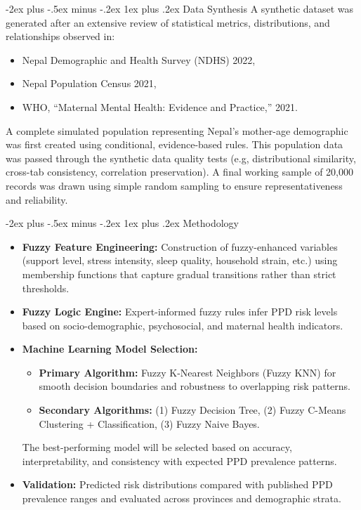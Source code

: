 \documentclass[conference]{IEEEtran}
\makeatletter
\def\section{\@startsection{section}{1}{0mm}
  {-2ex plus -.5ex minus -.2ex}
  {1ex plus .2ex}
  {\normalfont\large\bfseries}}
\makeatother
\begin{document}
\vspace{-6pt}
\section{Data Synthesis}
A synthetic dataset was generated after an extensive review of statistical metrics, distributions, and relationships observed in:
\begin{itemize}
    \item Nepal Demographic and Health Survey (NDHS) 2022,
    \item Nepal Population Census 2021,
    \item WHO, “Maternal Mental Health: Evidence and Practice,” 2021.
\end{itemize}

A complete simulated population representing Nepal’s mother-age 
demographic was first created using conditional, evidence-based rules. 
This population data was passed through the synthetic data quality tests 
(e.g, distributional similarity, cross-tab consistency, correlation 
preservation). A final working sample of 20,000 records was drawn 
using simple random sampling to ensure 
representativeness and reliability.

\vspace{-6pt}
\section{Methodology}
\begin{itemize}
    \item \textbf{Fuzzy Feature Engineering:} Construction of fuzzy-enhanced variables (support level, stress intensity, sleep quality, household strain, etc.) using membership functions that capture gradual transitions rather than strict thresholds.
    \item \textbf{Fuzzy Logic Engine:} Expert-informed fuzzy rules infer PPD risk levels based on socio-demographic, psychosocial, and maternal health indicators.
    \item \textbf{Machine Learning Model Selection:}
    \begin{itemize}
        \item \textbf{Primary Algorithm:} Fuzzy K-Nearest Neighbors (Fuzzy KNN) for smooth decision boundaries and robustness to overlapping risk patterns.
        \item \textbf{Secondary Algorithms:}  
              (1) Fuzzy Decision Tree,  
              (2) Fuzzy C-Means Clustering + Classification,  
              (3) Fuzzy Naive Bayes.
    \end{itemize}
    The best-performing model will be selected based on accuracy, interpretability, and consistency with expected PPD prevalence patterns.
    \item \textbf{Validation:} Predicted risk distributions compared with published PPD prevalence ranges and evaluated across provinces and demographic strata.
\end{itemize}
\end{document}
